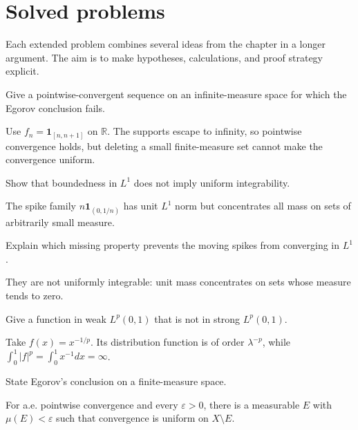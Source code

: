 \section{Solved problems}
Each extended problem combines several ideas from the chapter in a longer argument. The aim is to make hypotheses, calculations, and proof strategy explicit.

\begin{problem}\label{prob:iii08-problem-01}
Give a pointwise-convergent sequence on an infinite-measure space for which the Egorov conclusion fails.
\end{problem}
\begin{solution}
Use \(f_n=\mathbf1_{[n,n+1]}\) on \(\mathbb R\). The supports escape to
infinity, so pointwise convergence holds, but deleting a small finite-measure
set cannot make the convergence uniform.
\end{solution}

\begin{problem}\label{prob:iii08-problem-02}
Show that boundedness in \(L^1\) does not imply uniform integrability.
\end{problem}
\begin{solution}
The spike family \(n\mathbf1_{(0,1/n)}\) has unit \(L^1\) norm but
concentrates all mass on sets of arbitrarily small measure.
\end{solution}

\begin{problem}\label{prob:iii08-problem-03}
Explain which missing property prevents the moving spikes from converging in \(L^1\).
\end{problem}
\begin{solution}
They are not uniformly integrable: unit mass concentrates on sets whose
measure tends to zero.
\end{solution}

\begin{problem}\label{prob:iii08-problem-04}
Give a function in weak \(L^p(0,1)\) that is not in strong \(L^p(0,1)\).
\end{problem}
\begin{solution}
Take \(f(x)=x^{-1/p}\). Its distribution function is of order
\(\lambda^{-p}\), while \(\int_0^1|f|^p=\int_0^1x^{-1}dx=\infty\).
\end{solution}

\begin{problem}\label{prob:iii08-problem-05}
State Egorov's conclusion on a finite-measure space.
\end{problem}
\begin{solution}
For a.e. pointwise convergence and every \(\varepsilon>0\), there is a
measurable \(E\) with \(\mu(E)<\varepsilon\) such that convergence is uniform
on \(X\setminus E\).
\end{solution}


